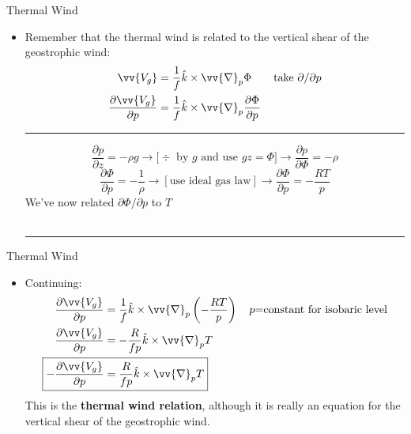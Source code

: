 \begin{frame}{Thermal Wind}

\begin{itemize}
	\item Remember that the thermal wind is related to the vertical shear of the geostrophic wind:
	\begin{align*}
	\vv{V_g} &= \frac{1}{f} \hat k \times \vv{\nabla}_p \Phi \qquad{\text{take $\partial/\partial p$}}\\
	\frac{\partial \vv{V_g}}{\partial p} &= \frac{1}{f} \hat k \times \vv{\nabla}_p \frac{\partial \Phi}{\partial p}
	\end{align*}
\hrule
$$\frac{\partial p}{\partial z} = -\rho g \rightarrow \text{[$\div$ by $g$ and use $gz=\Phi$]} \rightarrow \frac{\partial p}{\partial \Phi} = -\rho$$
$$\frac{\partial \Phi}{\partial p} = -\frac{1}{\rho} \rightarrow [\text{use ideal gas law}] \rightarrow \frac{\partial \Phi}{\partial p} = -\frac{RT}{p}$$
We've now related $\partial \Phi/\partial p$ to $T$
~\\~\\
\hrule
\end{itemize}
\end{frame}
\begin{frame}{Thermal Wind}

\begin{itemize}
	\item Continuing:
	\begin{align*}
	\frac{\partial \vv{V_g}}{\partial p} &= \frac{1}{f} \hat k \times \vv{\nabla}_p \left(-\frac{RT}{p}\right)\quad \text{$p$=constant for isobaric level}\\
	\frac{\partial \vv{V_g}}{\partial p} &= -\frac{R}{fp} \hat k \times \vv{\nabla}_p T\\
	\Aboxed{-\frac{\partial \vv{V_g}}{\partial p} &= \frac{R}{fp} \hat k \times \vv{\nabla}_p T}
	\end{align*}
	This is the \textbf{thermal wind relation}, although it is really an equation for the vertical shear of the geostrophic wind.
\end{itemize}
\end{frame}
